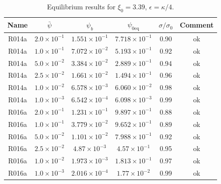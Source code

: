 \begin{table}
\begin{center}
\begin{tabular}{|c|c|c|c|c|c|}
\hline
Name & $\bar{\psi}$ & $\psi_b$ & $\psi_{0\mathrm{eq}}$
     & $\sigma / \sigma_0$  & Comment \\
\hline
R014a &  $2.0\times 10^{-1}$ & $1.551\times 10^{-1}$ & $7.718\times10^{-1}$
      & 0.90 & ok\\
R014a &  $1.0\times 10^{-1}$ & $7.072\times 10^{-2}$ & $5.193\times10^{-1}$
      & 0.92 & ok\\
R014a &  $5.0\times 10^{-2}$ & $3.384\times 10^{-2}$ & $2.889\times10^{-1}$
      & 0.94 & ok\\
R014a &  $2.5\times 10^{-2}$ & $1.661\times 10^{-2}$ & $1.494\times10^{-1}$
      & 0.96 & ok\\
R014a &  $1.0\times 10^{-2}$ & $6.578\times 10^{-3}$ & $6.060\times10^{-2}$
      & 0.98 & ok\\
R014a &  $1.0\times 10^{-3}$ & $6.542\times 10^{-4}$ & $6.098\times10^{-3}$
      & 0.99 & ok\\
\hline
R016a &  $2.0\times 10^{-1}$ & $1.231\times 10^{-1}$ & $9.897\times10^{-1}$
      & 0.88 & ok\\
R016a &  $1.0\times 10^{-1}$ & $3.779\times 10^{-2}$ & $9.652\times10^{-1}$
      & 0.89 & ok\\
R016a &  $5.0\times 10^{-2}$ & $1.101\times 10^{-2}$ & $7.988\times10^{-1}$
      & 0.92 & ok\\
R016a &  $2.5\times 10^{-2}$ & $4.87\times 10^{-3}$ & $4.57\times10^{-1}$
      & 0.95 & ok\\
R016a &  $1.0\times 10^{-2}$ & $1.973\times 10^{-3}$ & $1.813\times10^{-1}$
      & 0.97 & ok\\
R016a &  $1.0\times 10^{-3}$ & $2.016\times 10^{-4}$ & $1.77\times10^{-2}$
      & 0.99 & ok\\
\hline
\end{tabular}
\label{table:xi226}
\caption{Equilibrium results for $\xi_0 = 3.39$, $\epsilon = \kappa/4$.}
\end{center}
\end{table}


